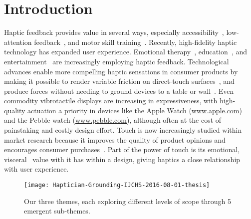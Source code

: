 \section{Introduction}
\noindent 
Haptic feedback provides value in several ways, especially accessibility~\citep{Bliss1970}, low-attention feedback~\citep{MacLean2009}, and motor skill training~\citep{Milot2010}.
Recently, high-fidelity haptic technology has expanded %
user experience. %
Emotional therapy~\citep{Yohanan2011affectdisplay,Vaucelle2009}, education~\citep{Sato2008}, and entertainment~\citep{SchneiderAsiaHaptics2014} are increasingly employing haptic feedback. %
Technological advances enable more compelling haptic sensations in consumer products by making it possible to render variable friction on direct-touch surfaces~\citep{Levesque2011,Winfield2007}, and produce forces without needing to ground devices to a table or wall~\citep{Culbertson2016,Winfree2009}.
Even commodity vibrotactile displays are increasing in expressiveness, with high-quality actuation a priority in devices like the Apple Watch (\url{www.apple.com}) and the Pebble watch (\url{www.pebble.com}), although
often at the cost of painstaking and costly design effort.
Touch is now increasingly studied within market research because it improves the quality of product opinions and encourages consumer purchases~\citep{Jansson-Boyd2011}.
Part of the power of touch is its emotional, visceral~\citep{Norman2004} value with it has within a design, giving haptics a close relationship with user experience.




\begin{figure}[t]
    \centering
    \texttt{[image: Haptician-Grounding-IJCHS-2016-08-01-thesis]}
    \caption{Our three themes, each exploring different levels of scope through 5 emergent sub-themes.}
    \label{fig:themeoutline}
\end{figure}




